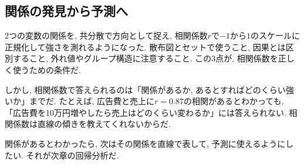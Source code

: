 \subsection{関係の発見から予測へ}

2つの変数の関係を, 共分散で方向として捉え, 相関係数$r$で$-1$から$1$のスケールに正規化して強さを測れるようになった.
散布図とセットで使うこと, 因果とは区別すること, 外れ値やグループ構造に注意すること.
この3点が, 相関係数を正しく使うための条件だ.

しかし, 相関係数で答えられるのは「関係があるか, あるとすればどのくらい強いか」までだ.
たとえば, 広告費と売上に$r = 0.87$の相関があるとわかっても, 「広告費を10万円増やしたら売上はどのくらい変わるか」には答えられない.
相関係数は直線の傾きを教えてくれないからだ.

関係があるとわかったら, 次はその関係を直線で表して, 予測に使えるようにしたい.
それが次章の回帰分析だ.
